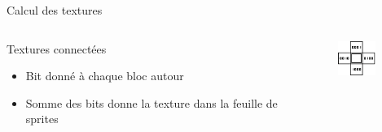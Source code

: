 \documentclass{beamer}
\begin{document}
{\begin{frame}{Calcul des textures}
    \begin{columns}
            \begin{block}{Textures connectées}
                \begin{itemize}
                    \item[\bullet] Bit donné à chaque bloc autour
                    \item[\bullet] Somme des bits donne la texture dans la feuille de sprites
                \end{itemize}
            \end{block}
            \begin{figure}
                \centering
                \includegraphics[width=0.8\textwidth]{images/connected_textures_offset_computing.png}
            \end{figure}
    \end{columns}
\end{frame}

}
\end{document}
